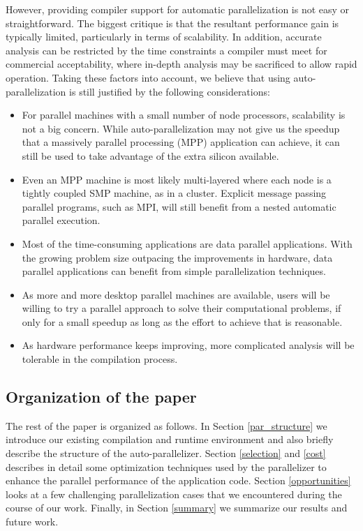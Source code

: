 However, providing compiler support for automatic parallelization is
not easy or straightforward. The biggest critique is that the
resultant performance gain is typically limited, particularly in terms of
scalability. In addition, accurate analysis can be restricted by the
time constraints a compiler must meet for commercial acceptability,
where in-depth analysis may be sacrificed to allow rapid operation.
Taking these factors into account, we believe that using
auto-parallelization is still justified by the following
considerations:

\begin{itemize}
\item For parallel machines with a small number of node processors,
  scalability is not a big concern. While auto-parallelization may not
  give us the speedup that a massively parallel processing (MPP) application can achieve, it can
  still be used to take advantage of the extra silicon available.
\item Even an MPP machine is most likely
  multi-layered where each node is a tightly coupled SMP machine, as in a
  cluster. Explicit message passing parallel programs, such as MPI, will
  still benefit from a nested automatic parallel execution.
\item Most of the time-consuming applications are data parallel
  applications. With the growing problem size outpacing the improvements in hardware, data parallel applications can benefit from simple parallelization techniques. 
\item As more and more desktop parallel machines are available, users
  will be willing to try a parallel approach to solve their
  computational problems, if only for a small speedup as long as the
  effort to achieve that is reasonable.
\item As hardware performance keeps improving, more complicated
  analysis will be tolerable in the compilation process.
\end{itemize}

\subsection{Organization of the paper}
The rest of the paper is organized as follows. In Section
\ref{par_structure} we introduce our existing compilation and runtime
environment and also briefly describe the structure of the auto-parallelizer. Section \ref{selection} and \ref{cost} describes in
detail some optimization techniques used by the parallelizer to
enhance the parallel performance of the application code.  Section
\ref{opportunities} looks at a few challenging parallelization cases
that we encountered during the course of our work.  Finally, in Section
\ref{summary} we summarize our results and future work.

